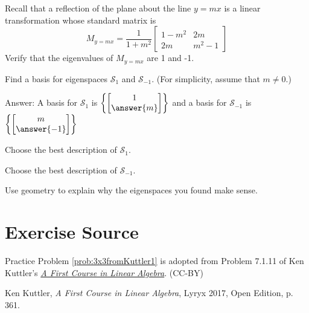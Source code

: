 \documentclass{ximera}
\begin{document}
\begin{problem}\label{prob:eigvectorstransfr2_3}
Recall that a reflection of the plane about the line $y=mx$ is a linear transformation whose standard matrix is
$$M_{y=mx}=\frac{1}{1+m^2}\begin{bmatrix}
1-m^2 & 2m \\
2m & m^2-1
\end{bmatrix}$$
Verify that the eigenvalues of $M_{y=mx}$ are
1 and -1.

Find a basis for eigenspaces $\mathcal{S}_{1}$ and $\mathcal{S}_{-1}$.  (For simplicity, assume that $m\neq 0$.)

Answer:  A basis for $\mathcal{S}_{1}$ is $\left\{\begin{bmatrix}1\\\answer{m}\end{bmatrix}\right\}$
and a basis for $\mathcal{S}_{-1}$ is $\left\{\begin{bmatrix}m\\\answer{-1}\end{bmatrix}\right\}$

Choose the best description of $\mathcal{S}_{1}$.
\begin{multipleChoice}
\end{multipleChoice}

Choose the best description of $\mathcal{S}_{-1}$.
\begin{multipleChoice}
\end{multipleChoice}

Use geometry to explain why the eigenspaces you found make sense.

\end{problem}


\section*{Exercise Source}
Practice Problem \ref{prob:3x3fromKuttler1} is adopted from Problem 7.1.11 of Ken Kuttler's \href{https://open.umn.edu/opentextbooks/textbooks/a-first-course-in-linear-algebra-2017}{\it A First Course in Linear Algebra}. (CC-BY)

Ken Kuttler, {\it  A First Course in Linear Algebra}, Lyryx 2017, Open Edition, p. 361.
\end{document}
